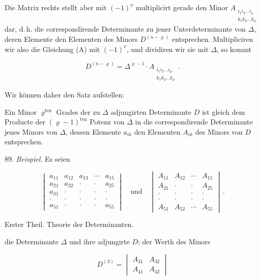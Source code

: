 Die Matrix rechts stellt aber mit $(-1)^{\nu}$ multiplicirt gerade den Minor $A_{\substack{i_1 i_2 \ldots i_\varrho\\k_1 k_2 \ldots k_\varrho}}$ dar, d.\,h. die correspondirende Determinante zu jener Unterdeterminante von $\Delta$, deren Elemente den Elementen des Minors $D^{(n-\varrho)}$ entsprechen. Multipliciren wir also die Gleichung (A) mit $(-1)^{\nu}$, und dividiren wir sie mit $\Delta$, so kommt

\[
D^{(n-\varrho)} = \Delta^{\varrho-1}\cdot A_{\substack{i_1 i_2 \ldots i_\varrho\\k_1 k_2 \ldots k_\varrho}}\, .
\]

Wir können daher den Satz aufstellen:

\glqq Ein Minor $\varrho^{\mathrm{ten}}$ Grades der zu $\Delta$ adjungirten Determinante $D$ ist gleich dem Producte der $(\varrho-1)^{\mathrm{ten}}$ Potenz von $\Delta$ in die correspondirende Determinante jenes Minors von $\Delta$, dessen Elemente $a_{ik}$ den Elementen $A_{ik}$ des Minors von $D$ entsprechen.\grqq{}

89. \textit{Beispiel.} Es seien

\[
\begin{vmatrix}
a_{11} & a_{12} & a_{13} & \cdots & a_{15} \\
a_{21} & a_{22} & \cdot & \cdot & a_{25} \\
a_{31} & \cdot & \cdot & \cdot & \cdot \\
\cdot & \cdot & \cdot & \cdot & \cdot \\
a_{51} & \cdot & \cdot & \cdot & a_{55}
\end{vmatrix}
\quad\text{und}\quad
\begin{vmatrix}
A_{11} & A_{12} & \cdots & A_{15} \\
A_{21} & \cdot & \cdot & A_{25} \\
\cdot & \cdot & \cdot & \cdot \\
\cdot & \cdot & \cdot & \cdot \\
A_{51} & A_{52} & \cdots & A_{55}
\end{vmatrix}\, .
\]


Erster Theil. Theorie der Determinanten.

die Determinante $\Delta$ und ihre adjungirte $D$; der Werth des Minors

\[
D^{(3)} =
\begin{vmatrix}
A_{31} & A_{32} \\
A_{41} & A_{42}
\end{vmatrix}
\]

